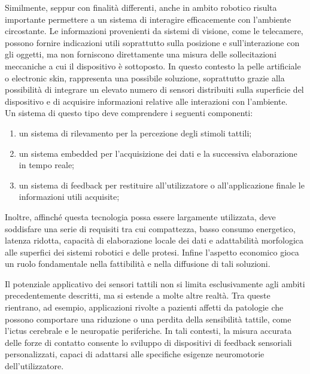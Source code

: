 \documentclass[10pt, a4paper]{article}
\begin{document}
        Similmente, seppur con finalità differenti, anche in ambito robotico risulta importante permettere a un sistema di interagire efficacemente con l'ambiente circostante. 
        Le informazioni provenienti 
        da sistemi di visione, come le telecamere, possono fornire indicazioni utili soprattutto sulla posizione e sull'interazione con gli oggetti, ma non forniscono direttamente una misura delle
        sollecitazioni meccaniche a cui il dispositivo è sottoposto.
        In questo contesto la pelle artificiale o electronic skin, rappresenta una possibile soluzione, soprattutto grazie alla possibilità
        di integrare un elevato numero di sensori distribuiti sulla superficie del dispositivo e di acquisire informazioni relative alle interazioni con l'ambiente.\\
        Un sistema di questo tipo deve comprendere i seguenti componenti:

            \begin{enumerate}
                    \item un sistema di rilevamento per la percezione degli stimoli tattili;
                    \item un sistema embedded per l'acquisizione dei dati e la successiva elaborazione in tempo reale;
                    \item un sistema di feedback per restituire all'utilizzatore o all'applicazione finale le informazioni utili acquisite;
            \end{enumerate}

        Inoltre, affinché questa tecnologia possa essere largamente utilizzata, deve soddisfare una serie di requisiti tra cui compattezza, basso consumo energetico, latenza ridotta, capacità di 
        elaborazione locale dei dati e adattabilità morfologica alle superfici dei sistemi robotici e delle protesi. Infine l'aspetto economico gioca un ruolo fondamentale nella fattibilità e nella 
        diffusione di tali soluzioni.

        Il potenziale applicativo dei sensori tattili non si limita esclusivamente agli ambiti precedentemente descritti, ma si estende a molte altre realtà. Tra queste rientrano, ad esempio, applicazioni rivolte 
        a pazienti affetti da patologie che possono comportare una riduzione o una perdita della sensibilità tattile, come l'ictus cerebrale e le neuropatie periferiche.
        In tali contesti, la misura accurata delle forze di contatto consente lo sviluppo di dispositivi di feedback sensoriali personalizzati, capaci di adattarsi alle specifiche esigenze neuromotorie dell'utilizzatore.
\end{document}

